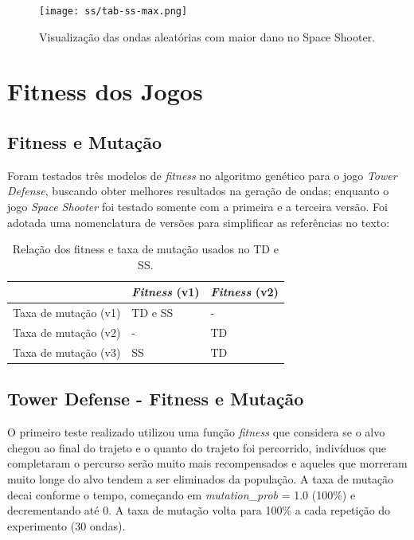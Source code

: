 \begin{figure}
  \centering
  \texttt{[image: ss/tab-ss-max.png]}
  \caption{Visualização das ondas aleatórias com maior dano no Space Shooter.\label{fig:ss-rd-max}}
\end{figure}

\pagebreak

\section{Fitness dos Jogos}
\label{sec:a-fitness}

\subsection{Fitness e Mutação}
\label{sec:a-fitness-mutacao-usados}

Foram testados três modelos de \textit{fitness} no algoritmo genético para o jogo \textit{Tower Defense}, buscando obter melhores resultados na geração de ondas; enquanto o jogo \textit{Space Shooter} foi testado somente com a primeira e a terceira versão. Foi adotada uma nomenclatura de versões para simplificar as referências no texto:

\begin{table}
\centering
\begin{tabular}{l|l|l}
                            & \textit{Fitness} (v1) & \textit{Fitness} (v2)  \\ \hline
Taxa de mutação (v1)             & TD e SS          & -                      \\
Taxa de mutação (v2)             &      -           & TD                     \\
Taxa de mutação (v3)             &      SS          & TD          

\end{tabular}
\caption{Relação dos fitness e taxa de mutação usados no TD e SS.}
\label{tab:fit-names}
\end{table}

\subsection{Tower Defense - Fitness e Mutação}
\label{sec:td-fit}

O primeiro teste realizado utilizou uma função \textit{fitness} que considera se o alvo chegou ao final do trajeto e o quanto do trajeto foi percorrido, indivíduos que completaram o percurso serão muito mais recompensados e aqueles que morreram muito longe do alvo tendem a ser eliminados da população. A taxa de mutação decai conforme o tempo, começando em \textit {mutation\_prob} = 1.0 (100\%) e decrementando até 0. A taxa de mutação volta para 100\% a cada repetição do experimento (30 ondas). 

